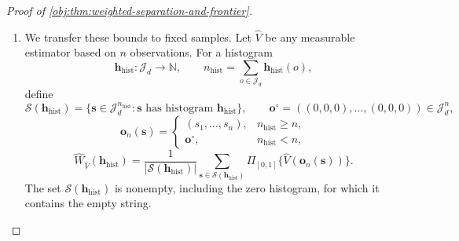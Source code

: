 \begin{proof}[Proof of \cref{obj:thm:weighted-separation-and-frontier}]
\begin{enumerate}
If
\[
128\mathfrak a^2\le d\delta_{\mathrm{de}}^2,
\]
the target-deviation probability at radius
\(\delta_{\mathrm{de}}/4\) is at most \(1/8\). Applying the midpoint argument above to the two dense centers gives, for every measurable estimator of the full counts,
\[
\max_{\iota=0,1}\mathcal B_{\mathrm{de},\iota}(\widehat W)
\ge\frac{5\delta_{\mathrm{de}}^2}{256}
\ge\frac5{2560000}\frac{\mathfrak a^2}{K_{\mathrm{abs}}^2},
\]
where
\[
\mathcal B_{\mathrm{de},\iota}(\widehat W)
=
E_{\mathbf T^{\mathrm{de}}\sim\eta_\iota^{\otimes d}}
E_{\mathrm{counts}\mid\mathbf T^{\mathrm{de}}}
[\{\widehat W-\Psi_{\mathrm{de}}(\mathbf T^{\mathrm{de}})\}^2].
\]
Choose
\[
C_{\mathrm{de}}=\max\{C_{\mathrm{tv}},2\},
\qquad
K_{\mathrm{de}}=\mathcal K_{\mathrm{cal}}(C_{\mathrm{de}},d).
\]
The same logarithmic cutoff construction, applied with packet comparison constant \(1/100\), supplies a universal
\(D_{\mathrm{de}}\ge2\) such that
\[
1280000K_{\mathrm{de}}^2\le d
\quad(d\ge D_{\mathrm{de}}).
\]
Since
\(\delta_{\mathrm{de}}^2\ge\mathfrak a^2/(10000K_{\mathrm{de}}^2)\),
this implies the required target-deviation condition. Reordering the four counts into the observed atom histogram is a bijection, so both integrated-risk bounds hold on that histogram space.

\item
We transfer these bounds to fixed samples. Let \(\widehat V\) be any measurable estimator based on \(n\) observations. For a histogram
\[
\boldsymbol h_{\mathrm{hist}}:\mathcal J_d\to\mathbb N,
\qquad
n_{\mathrm{hist}}=\sum_{o\in\mathcal J_d}\boldsymbol h_{\mathrm{hist}}(o),
\]
define
\[
\mathcal S(\boldsymbol h_{\mathrm{hist}})
=\{\boldsymbol s\in\mathcal J_d^{n_{\mathrm{hist}}}:
\boldsymbol s\text{ has histogram }\boldsymbol h_{\mathrm{hist}}\},
\qquad
\boldsymbol o^\circ=((0,0,0),\ldots,(0,0,0))\in\mathcal J_d^n,
\]
\[
\boldsymbol o_n(\boldsymbol s)=
\begin{cases}
(s_1,\ldots,s_n),&n_{\mathrm{hist}}\ge n,\\
\boldsymbol o^\circ,&n_{\mathrm{hist}}<n,
\end{cases}
\]
\[
\widehat W_{\widehat V}(\boldsymbol h_{\mathrm{hist}})
=\frac1{|\mathcal S(\boldsymbol h_{\mathrm{hist}})|}
 \sum_{\boldsymbol s\in\mathcal S(\boldsymbol h_{\mathrm{hist}})}
 \Pi_{[0,1]}\{\widehat V(\boldsymbol o_n(\boldsymbol s))\}.
\]
The set \(\mathcal S(\boldsymbol h_{\mathrm{hist}})\) is nonempty, including the zero histogram, for which it contains the empty string.


\end{enumerate}
\end{proof}
